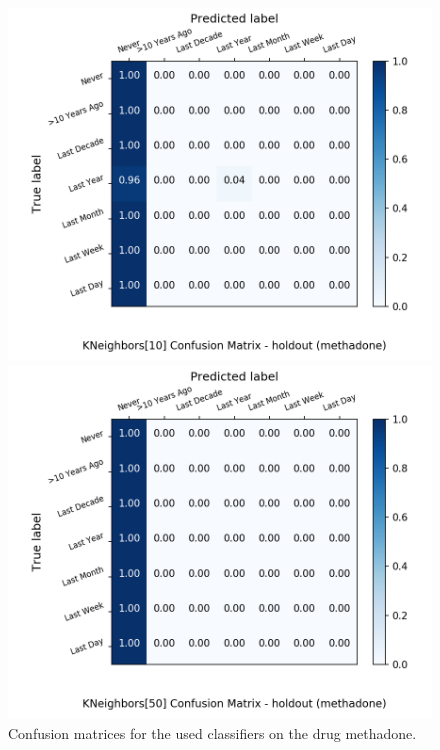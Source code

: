 \begin{figure}[H]
\begin{minipage}[b]{0.32\textwidth}
		\includegraphics[width=1.1\textwidth]{Plots/methadone_KNeighbors_10_balance_False_holdout.png}
  \end{minipage}
	\begin{minipage}[b]{0.32\textwidth}
		\includegraphics[width=1.1\textwidth]{Plots/methadone_KNeighbors_50_balance_False_holdout.png}
  \end{minipage}
	\caption{Confusion matrices for the used classifiers on the drug methadone.}
\end{figure}

